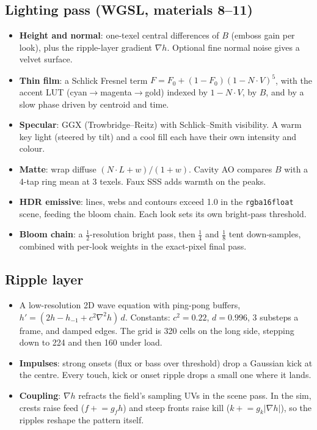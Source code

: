 \documentclass[10pt,a4paper]{article}
\newcommand{\code}[1]{\texttt{\small #1}}
\begin{document}
\subsection{Lighting pass (WGSL, materials 8--11)}
\begin{itemize}
\item \textbf{Height and normal}: one-texel central differences of $B$ (emboss gain per look), plus the ripple-layer gradient $\nabla h$.
Optional fine normal noise gives a velvet surface.
\item \textbf{Thin film}: a Schlick Fresnel term $F=F_0+(1-F_0)(1-N\!\cdot\!V)^5$, with the accent LUT (cyan$\to$magenta$\to$gold) indexed by $1-N\!\cdot\!V$,
by $B$, and by a slow phase driven by centroid and time.
\item \textbf{Specular}: GGX (Trowbridge--Reitz) with Schlick--Smith visibility. A warm key light (steered by tilt) and a cool fill each have their own intensity and colour.
\item \textbf{Matte}: wrap diffuse $(N\!\cdot\!L+w)/(1+w)$. Cavity AO compares $B$ with a 4-tap ring mean at 3 texels. Faux SSS adds warmth on the peaks.
\item \textbf{HDR emissive}: lines, webs and contours exceed 1.0 in the \code{rgba16float} scene, feeding the bloom chain. Each look sets its own bright-pass threshold.
\item \textbf{Bloom chain}: a $\tfrac12$-resolution bright pass, then $\tfrac14$ and $\tfrac18$ tent down-samples, combined with per-look weights in the exact-pixel final pass.
\end{itemize}

\subsection{Ripple layer}
\begin{itemize}
\item A low-resolution 2D wave equation with ping-pong buffers, $h' = (2h - h_{-1} + c^2\nabla^2 h)\,d$. Constants: $c^2=0.22$, $d=0.996$, 3 substeps a frame, and damped edges.
The grid is 320 cells on the long side, stepping down to 224 and then 160 under load.
\item \textbf{Impulses}: strong onsets (flux or bass over threshold) drop a Gaussian kick at the centre. Every touch, kick or onset ripple drops a small one where it lands.
\item \textbf{Coupling}: $\nabla h$ refracts the field's sampling UVs in the scene pass. In the sim, crests raise feed ($f \mathrel{+}= g_f h$) and steep fronts raise kill
($k \mathrel{+}= g_k|\nabla h|$), so the ripples reshape the pattern itself.
\end{itemize}
\end{document}
